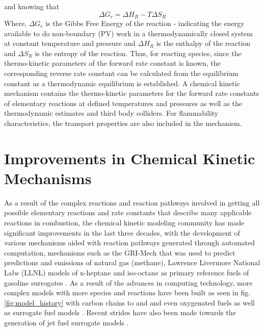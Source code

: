   and knowing that 
  \begin{equation}
    \Delta G_r = \Delta H_R -T\Delta S_R  
  \end{equation}
Where, $\Delta G_r$ is the Gibbs Free Energy of the reaction - indicating the energy available to do non-boundary (PV) work in a thermodynamically closed system at constant temperature and pressure and $\Delta H_R$ is the enthalpy of the reaction and $\Delta S_R$ is the entropy of the reaction. Thus, for reacting species, since the thermo-kinetic parameters of the forward rate constant is known, the corresponding reverse rate constant can be calculated from the equilibrium constant as a thermodynamic equilibrium is established. A chemical kinetic mechanism contains the thermo-kinetic parameters for the forward rate constants of elementary reactions at defined temperatures and pressures as well as the thermodynamic estimates and third body colliders. For flammability characteristics, the transport properties are also included in the mechanism.
 
 \section{Improvements in Chemical Kinetic Mechanisms}
 As a result of the complex reactions and reaction pathways involved in getting all possible elementary reactions and rate constants that describe many applicable reactions in combustion, the chemical kinetic modeling community has made significant improvements in the last three decades, with the development of various mechanisms aided with reaction pathways generated through automated computation, mechanisms such as the GRI-Mech\cite{Frenklach1995GRI-Mech---AnGRI-95/0058}\cite{BowmanGRI-Mech2.11}\cite{SmithGRI-Mech3.0} that was used to predict  predictions and emissions of natural gas (methane),  Lawrence Livermore National Labs (LLNL) models of n-heptane and iso-octane as primary reference fuels of gasoline surrogates \cite{Curran1998AOxidation}\cite{Curran2002AOxidation}. As a result of the advances in computing technology, more complex models with more species and reactions have been built as seen in fig.\ref{fig:model_history} with carbon chains to  and \cite{Westbrook2009AN-hexadecane}\cite{Sarathy2011ComprehensiveC20} and even oxygenated fuels \cite{Fischer2000TheReactors} as well as surrogate fuel models \cite{Mehl2011AnModelingb}. Recent strides have also been made towards the generation of jet fuel surrogate models \cite{Gokulakrishnan2008IgnitionFuel} \cite{Dooley2010AProperties}\cite{Mze-Ahmed2010KineticsStudy}\cite{Wang2012}\cite{Dagaut2014}\cite{Dagaut2014CombustionModeling}\cite{Narayanaswamy2016ASurrogates}\cite{Dagaut2016ExperimentalSurrogates}\cite{Singh2011ExperimentalFlames}. 
 
